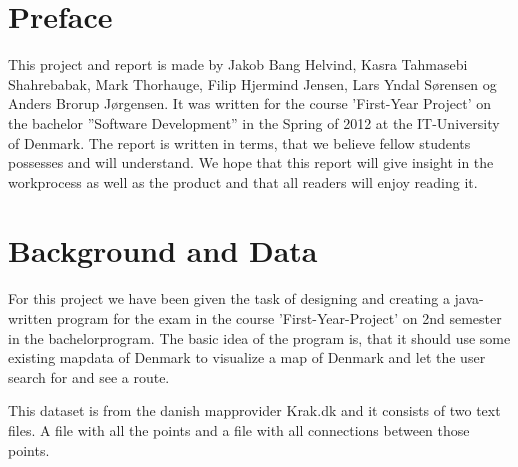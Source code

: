 \documentclass[a4paper,10pt,titlepage]{article}
\begin{document}
	\tableofcontents
	
	\newpage
	\section{Preface}
		This project and report is made by Jakob Bang Helvind, Kasra Tahmasebi Shahrebabak, Mark Thorhauge, Filip Hjermind Jensen, Lars Yndal S\o rensen og
		Anders Brorup J\o rgensen. It was written for the course ’First-Year Project’ on the bachelor ”Software Development” in the Spring of 2012 at the
		IT-University of Denmark. The report is written in terms, that we believe fellow students possesses and will understand. We hope that this 
		report will give insight in the workprocess as well as the product and that all readers will enjoy reading it.
		
	\newpage
	\section{Background and Data}
	
		For this project we have been given the task of designing and creating a java-written program 
		for the exam in the course 'First-Year-Project' on 2nd semester in the bachelorprogram. The basic idea of the 
		program is, that it should use some existing mapdata of Denmark to visualize a map of Denmark and let the user search for and see a route. 

		This dataset is from the danish mapprovider Krak.dk and it consists of two text files. A file with all the points 
		and a file with all connections between those points.\\
 
\end{document}
